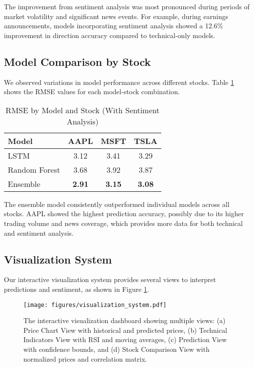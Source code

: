 \documentclass[review]{elsarticle}
\begin{document}
The improvement from sentiment analysis was most pronounced during periods of market volatility and significant news events. For example, during earnings announcements, models incorporating sentiment analysis showed a 12.6\% improvement in direction accuracy compared to technical-only models.

\subsection{Model Comparison by Stock}

We observed variations in model performance across different stocks. Table \ref{tab:stock-comparison} shows the RMSE values for each model-stock combination.

\begin{table}[h]
\centering
\caption{RMSE by Model and Stock (With Sentiment Analysis)}
\label{tab:stock-comparison}
\begin{tabular}{lccc}
\toprule
\textbf{Model} & \textbf{AAPL} & \textbf{MSFT} & \textbf{TSLA} \\
\midrule
LSTM & 3.12 & 3.41 & 3.29 \\
Random Forest & 3.68 & 3.92 & 3.87 \\
Ensemble & \textbf{2.91} & \textbf{3.15} & \textbf{3.08} \\
\bottomrule
\end{tabular}
\end{table}

The ensemble model consistently outperformed individual models across all stocks. AAPL showed the highest prediction accuracy, possibly due to its higher trading volume and news coverage, which provides more data for both technical and sentiment analysis.

\subsection{Visualization System}

Our interactive visualization system provides several views to interpret predictions and sentiment, as shown in Figure \ref{fig:visualization-system}.

\begin{figure}[h]
\centering
\texttt{[image: figures/visualization\_system.pdf]}
\caption{The interactive visualization dashboard showing multiple views: (a) Price Chart View with historical and predicted prices, (b) Technical Indicators View with RSI and moving averages, (c) Prediction View with confidence bounds, and (d) Stock Comparison View with normalized prices and correlation matrix.}
\label{fig:visualization-system}
\end{figure}
\end{document}
